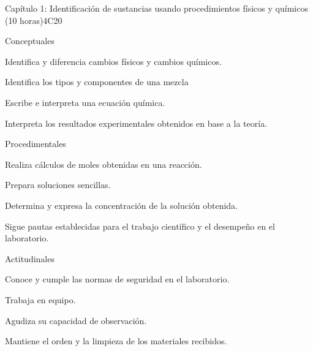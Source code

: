 \begin{syllabus}
\begin{outcomes}
\item {}
\item {}
\end{outcomes}

\begin{competences}
    \item {}
\end{competences}

\begin{unit}{Capítulo 1: Identificación de sustancias usando procedimientos físicos y químicos (10 horas)}{}{}{4}{C20}

Conceptuales

\begin{topics}
      \item Identifica y diferencia cambios físicos y cambios químicos.
      \item Identifica los tipos y componentes de una mezcla
      \item Escribe e interpreta una ecuación química.
      \item Interpreta los resultados experimentales obtenidos en base a la teoría.
   \end{topics}
   
   Procedimentales

\begin{topics}
      \item Realiza cálculos de moles obtenidas en una reacción. 
      \item Prepara soluciones sencillas.
      \item Determina y expresa la concentración de la solución obtenida.
      \item Sigue pautas establecidas para el trabajo científico y el desempeño en el laboratorio.
   \end{topics}
   
   Actitudinales

\begin{topics}
      \item Conoce y cumple las normas de seguridad en el laboratorio.
      \item Trabaja en equipo.
      \item Agudiza su capacidad de observación.
      \item Mantiene el orden y la limpieza de los materiales recibidos.
   \end{topics}


\end{unit}
\end{syllabus}
